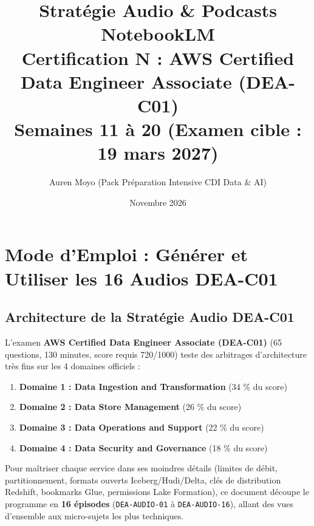 \documentclass[11pt,a4paper]{article}
\title{\textbf{Stratégie Audio \& Podcasts NotebookLM}\\
\Large Certification N\textdegree 3 : AWS Certified Data Engineer Associate (DEA-C01)\\
\large Semaines 11 à 20 (Examen cible : 19 mars 2027)}
\author{Auren Moyo (Pack Préparation Intensive CDI Data \& AI)}
\date{Novembre 2026}
\begin{document}
\maketitle
\tableofcontents
\newpage

\section{Mode d'Emploi : Générer et Utiliser les 16 Audios DEA-C01}

\subsection{Architecture de la Stratégie Audio DEA-C01}
L'examen \textbf{AWS Certified Data Engineer Associate (DEA-C01)} (65 questions, 130 minutes, score requis 720/1000) teste des arbitrages d'architecture très fins sur les 4 domaines officiels :
\begin{enumerate}[noitemsep]
    \item \textbf{Domaine 1 : Data Ingestion and Transformation} (34 \% du score)
    \item \textbf{Domaine 2 : Data Store Management} (26 \% du score)
    \item \textbf{Domaine 3 : Data Operations and Support} (22 \% du score)
    \item \textbf{Domaine 4 : Data Security and Governance} (18 \% du score)
\end{enumerate}

Pour maîtriser chaque service dans ses moindres détails (limites de débit, partitionnement, formats ouverts Iceberg/Hudi/Delta, clés de distribution Redshift, bookmarks Glue, permissions Lake Formation), ce document découpe le programme en \textbf{16 épisodes} (\texttt{DEA-AUDIO-01} à \texttt{DEA-AUDIO-16}), allant des vues d'ensemble aux micro-sujets les plus techniques.
\end{document}
